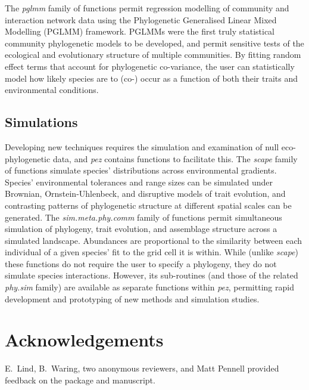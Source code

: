 \documentclass{bioinfo}
\begin{document}
The \emph{pglmm} family of functions permit regression modelling of
community \citep{Ives2011} and interaction network data
\citep{Rafferty2013} using the Phylogenetic Generalised Linear Mixed
Modelling (PGLMM) framework. PGLMMs were the first truly statistical
community phylogenetic models to be developed, and permit sensitive
tests of the ecological and evolutionary structure of multiple
communities. By fitting random effect terms that account for
phylogenetic co-variance, the user can statistically model how likely
species are to (co-) occur as a function of both their traits and
environmental conditions.
\subsection{Simulations}
Developing new techniques requires the simulation and examination of
null eco-phylogenetic data, and \emph{pez} contains functions to
facilitate this. The \emph{scape} family of functions
\citep[following][]{Helmus2012} simulate species' distributions across
environmental gradients. Species' environmental tolerances and range
sizes can be simulated under Brownian, Ornstein-Uhlenbeck, and
disruptive models of trait evolution, and contrasting patterns of
phylogenetic structure at different spatial scales can be
generated. The \emph{sim.meta.phy.comm} family of functions permit
simultaneous simulation of phylogeny, trait evolution, and assemblage
structure across a simulated landscape. Abundances are proportional to
the similarity between each individual of a given species' fit to the
grid cell it is within. While (unlike \emph{scape}) these functions do
not require the user to specify a phylogeny, they do not simulate
species interactions. However, its sub-routines (and those of the
related \emph{phy.sim} family) are available as separate functions
within \emph{pez}, permitting rapid development and prototyping of new
methods and simulation studies.
\section*{Acknowledgements}
E.\ Lind, B.\ Waring, two anonymous reviewers, and Matt Pennell
provided feedback on the package and manuscript.
\end{document}
